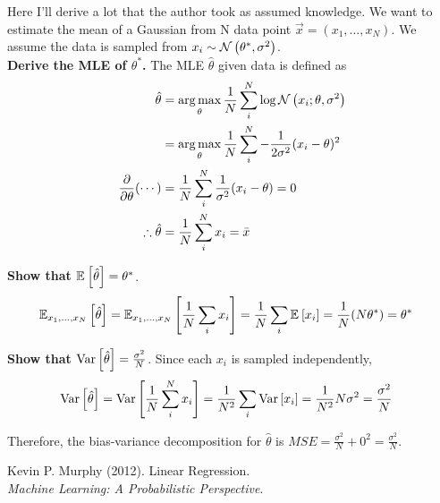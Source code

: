 \documentclass[11pt]{article}
\begin{document}
\begin{example}
	Here I'll derive a lot that the author took as assumed knowledge. We want to estimate the mean of a Gaussian from N data point $\vec x = (x_1, \ldots, x_N)$. We assume the data is sampled from $x_i \sim \Gauss{\theta^*, \sigma^2}$.  \\
	
	\textbf{Derive the MLE of $\theta^*$.} The MLE $\hat\theta$ given data is defined as
	\begin{align}
		\hat\theta 
			&= \argmax_{\theta} \inv{N} \sum_i^N \log \Gauss{x_i; \theta, \sigma^2} \\
			&= \argmax_{\theta} \inv{N} \sum_i^N -\inv{2\sigma^2} (x_i - \theta)^2 \\
		\pderiv{}{\theta} (\cdots)
			&= \inv{N} \sum_i^N \inv{\sigma^2} (x_i - \theta) = 0 \\
		\therefore \hat\theta
			&= \inv{N} \sum_i^N x_i = \bar x
	\end{align}
	
	\textbf{Show that $\E{\hat\theta} = \theta^*$}.
	\begin{align}
		\E[x_1, \ldots, x_N]{\hat\theta}
			&= \E[x_1, \ldots, x_N]{\inv{N}\sum_i x_i}
			= \inv{N}\sum_i \E{x_i}
			= \inv{N} (N \theta^*)
			= \theta^*
	\end{align}
	
	\textbf{Show that $\Var{\hat\theta} = \tfrac{\sigma^2}{N}$}. Since each $x_i$ is sampled independently,
	\begin{align}
		\Var{\hat\theta}
			&= \Var{\inv{N}\sum_i^N x_i} 
			= \inv{N^2}\sum_i \Var{x_i} = \inv{N^2} N \sigma^2 = \frac{\sigma^2}{N}
	\end{align}
	
	Therefore, the bias-variance decomposition for $\hat\theta$ is $MSE = \frac{\sigma^2}{N} + 0^2 = \frac{\sigma^2}{N}$. 
\end{example}








\vspace{-1.7em}
{\scriptsize Kevin P. Murphy (2012). Linear Regression.\\ \textit{Machine Learning: A Probabilistic Perspective}.\\ }
\end{document}
